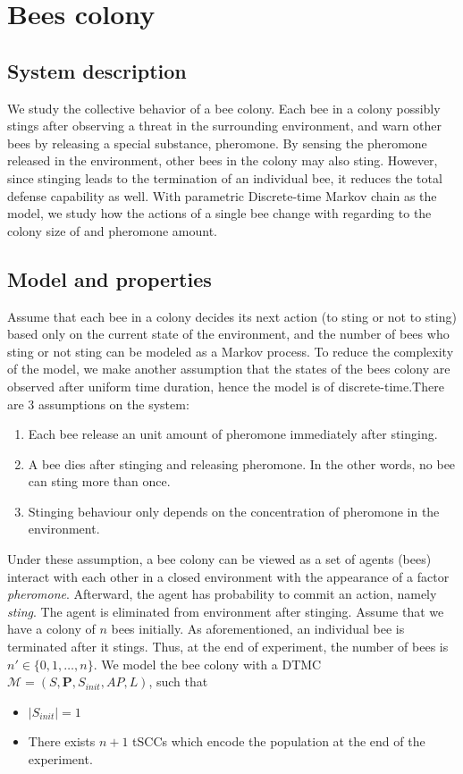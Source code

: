 \section{Bees colony}
\subsection{System description}
We study the collective behavior of a bee colony. Each bee in a colony possibly stings after
observing a threat in the surrounding environment, and warn other bees by releasing a special
substance, pheromone. By sensing the pheromone released in the environment, other bees in the colony
may also sting. However, since stinging leads to the termination of an individual bee, it reduces
the total defense capability as well. With parametric Discrete-time Markov chain as the model, we
study how the actions of a single bee change with regarding to the colony size of and pheromone
amount.

\subsection{Model and properties}
Assume that each bee in a colony decides its next action (to sting or not to sting) based only on
the current state of the environment, and the number of bees who sting or not sting can be modeled
as a Markov process. To reduce the complexity of the model, we make another assumption that the
states of the bees colony are observed after uniform time duration, hence the model is of
discrete-time.There are 3 assumptions on the system:
\begin{enumerate}
    \item Each bee release an unit amount of pheromone immediately after stinging.
    \item A bee dies after stinging and releasing pheromone. In the other words, no bee can sting
          more than once.
    \item Stinging behaviour only depends on the concentration of pheromone in the environment.
\end{enumerate}
Under these assumption, a bee colony can be viewed as a set of agents (bees) interact with each
other in a closed environment with the appearance of a factor \textit{pheromone}. Afterward, the
agent has probability to commit an action, namely \textit{sting}. The agent is eliminated from
environment after stinging. Assume that we have a colony of $n$ bees initially. As aforementioned,
an individual bee is terminated after it stings. Thus, at the end of experiment, the number of bees
is $n'\in\{0,1,\ldots,n\}$. We model the bee colony with a DTMC $\mathcal{M}=(S,\mathbf{P},
    S_{init}, AP,L)$, such that
\begin{itemize}
    \item $|S_{init}|=1$
    \item There exists $n+1$ tSCCs which encode the population at the end of the experiment.
\end{itemize}

